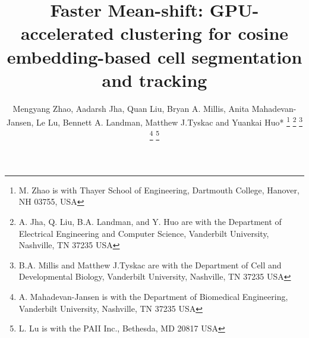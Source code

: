 \documentclass[journal,twoside,web]{ieeecolor}
\begin{document}
\title{Faster Mean-shift: GPU-accelerated clustering for cosine embedding-based cell segmentation and tracking}

\author{Mengyang Zhao, Aadarsh Jha, Quan Liu, Bryan A. Millis, Anita Mahadevan-Jansen, Le Lu, Bennett A. Landman, Matthew J.Tyskac and Yuankai Huo* 
\thanks{M. Zhao is with Thayer School of Engineering, Dartmouth College, Hanover, NH 03755, USA}
\thanks{A. Jha, Q. Liu, B.A. Landman, and Y. Huo are with the Department of Electrical Engineering and Computer Science, Vanderbilt University, Nashville, TN 37235 USA}
\thanks{B.A. Millis and Matthew J.Tyskac are with the Department of Cell and Developmental Biology, Vanderbilt University, Nashville, TN 37235 USA}
\thanks{A. Mahadevan-Jansen is with the Department of Biomedical Engineering, Vanderbilt University, Nashville, TN 37235 USA}
\thanks{L. Lu is with the PAII Inc.,  Bethesda, MD 20817 USA}
}

\maketitle
\end{document}

